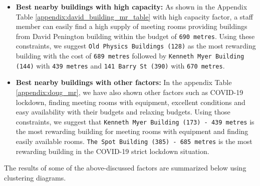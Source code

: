 \begin{itemize}

\item \textbf{Best nearby buildings with high capacity:} As shown in the Appendix Table \ref{appendix:david_building_mr_table} with high capacity factor, a staff member can easily find a high supply of meeting rooms providing buildings from David Penington building within the budget of \texttt{690 metres}. Using these constraints, we suggest \texttt{Old Physics Buildings (128)} as the most rewarding building with the cost of \texttt{689 metres} followed by \texttt{Kenneth Myer Building (144)} with \texttt{439 metres} and \texttt{141 Barry St (390)} with \texttt{670 metres}.

\item \textbf{Best nearby buildings with other factors:} In the appendix Table \ref{appendix:doug_mr}, we have also shown other factors such as COVID-19 lockdown, finding meeting rooms with equipment, excellent conditions and easy availability with their budgets and relaxing budgets. Using those constraints, we suggest that \texttt{Kenneth Myer Building (173) - 439 metres} is the most rewarding building for meeting rooms with equipment and finding easily available rooms. \texttt{The Spot Building (385) - 685 metres} is the most rewarding building in the COVID-19 strict lockdown situation.

\end{itemize}

The results of some of the above-discussed factors are summarized below using clustering diagrams.

